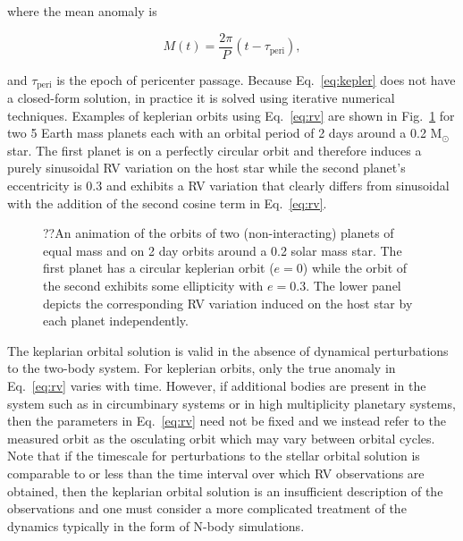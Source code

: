 \noindent where the mean anomaly is

\begin{equation}
M(t) = \frac{2\pi}{P} (t-\tau_{\mathrm{peri}}), 
\end{equation}

\noindent and $\tau_{\mathrm{peri}}$ is the epoch of 
pericenter passage. Because Eq.~\ref{eq:kepler} does not have a closed-form 
solution, in practice it is solved using iterative numerical techniques. 
Examples of keplerian orbits using Eq.~\ref{eq:rv} are shown in Fig.~\ref{fig:rv} 
for two 5 Earth mass planets each with an orbital period of 2 days around a 0.2 M$_{\odot}$ 
star. The first planet is on a perfectly circular orbit and therefore induces a purely
sinusoidal RV variation on the host star while the second planet's eccentricity is 0.3 and
exhibits a RV variation that clearly differs from sinusoidal with the addition of the second
cosine term in Eq.~\ref{eq:rv}. \\

\begin{figure}
  \centering
  \caption[Animation of observed radial velocities for different orbital configurations.]
      {??An animation of the orbits of two (non-interacting) planets of equal
    mass and on 2 day orbits around a 0.2 solar mass star. The first planet has a circular
    keplerian orbit ($e=0$) while the orbit of the second exhibits some ellipticity with
    $e=0.3$. The lower panel depicts the corresponding RV variation induced on the host star
    by each planet independently.}
  \label{fig:rv}
\end{figure}

The keplarian orbital solution is valid in the absence of dynamical 
perturbations to the two-body system. For keplerian orbits, only the true anomaly in
Eq.~\ref{eq:rv} varies with time. However,
if additional bodies are present in the system such as in circumbinary  
systems or in high multiplicity planetary systems, then the parameters in 
Eq.~\ref{eq:rv} need not be fixed and we instead refer to the measured orbit as the 
osculating orbit which may vary between orbital cycles. Note that if the timescale 
for perturbations to the stellar orbital solution is comparable to or less than the 
time interval over which RV observations are obtained, then the keplarian 
orbital solution is an insufficient description of the observations and one must consider
a more complicated treatment of the dynamics typically in the form of N-body simulations.


